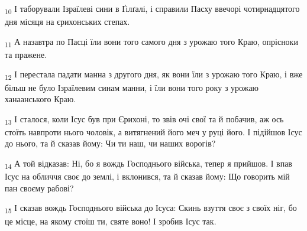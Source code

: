 \begin{tcolorbox}
\textsubscript{10} І таборували Ізраїлеві сини в Ґілґалі, і справили Пасху ввечорі чотирнадцятого дня місяця на єрихонських степах.
\end{tcolorbox}
\begin{tcolorbox}
\textsubscript{11} А назавтра по Пасці їли вони того самого дня з урожаю того Краю, опрісноки та пражене.
\end{tcolorbox}
\begin{tcolorbox}
\textsubscript{12} І перестала падати манна з другого дня, як вони їли з урожаю того Краю, і вже більш не було Ізраїлевим синам манни, і їли вони того року з урожаю ханаанського Краю.
\end{tcolorbox}
\begin{tcolorbox}
\textsubscript{13} І сталося, коли Ісус був при Єрихоні, то звів очі свої та й побачив, аж ось стоїть навпроти нього чоловік, а витягнений його меч у руці його. І підійшов Ісус до нього, та й сказав йому: Чи ти наш, чи наших ворогів?
\end{tcolorbox}
\begin{tcolorbox}
\textsubscript{14} А той відказав: Ні, бо я вождь Господнього війська, тепер я прийшов. І впав Ісус на обличчя своє до землі, і вклонився, та й сказав йому: Що говорить мій пан своєму рабові?
\end{tcolorbox}
\begin{tcolorbox}
\textsubscript{15} І сказав вождь Господнього війська до Ісуса: Скинь взуття своє з своїх ніг, бо це місце, на якому стоїш ти, святе воно! І зробив Ісус так.
\end{tcolorbox}
